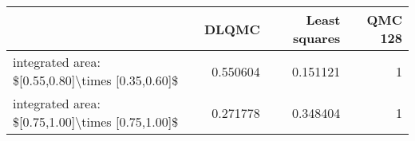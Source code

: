\begin{tabular}{lrrr}
\toprule
                                                  &    DLQMC &   Least squares &   QMC 128 \\
\midrule
 integrated area: \$[0.55,0.80]\textbackslash{}times [0.35,0.60]\$ & 0.550604 &        0.151121 &         1 \\
 integrated area: \$[0.75,1.00]\textbackslash{}times [0.75,1.00]\$ & 0.271778 &        0.348404 &         1 \\
\bottomrule
\end{tabular}
